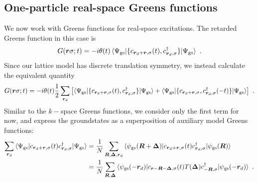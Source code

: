\subsection{One-particle real-space Greens functions}\label{tileRealspaceGreen}
We now work with Greens functions for real-space excitations. The retarded Greens function in this case is
\begin{equation}\begin{aligned}
	G({\bm r}\sigma; t) = -i\theta(t) \braket{\Psi_\text{gs} | \{ c_{{\bm r_d + \bm r},\sigma}(t), c^\dagger_{{\bm r_d},\sigma} \} | \Psi_\text{gs}}~.
\end{aligned}\end{equation}
Since our lattice model has discrete translation symmetry, we instead calculate the equivalent quantity
\begin{equation}\begin{aligned}\label{realFull}
	G({\bm r}\sigma; t) = -i\theta(t) \frac{1}{2}\sum_{\bm r_d}\left[\braket{\Psi_\text{gs} | \{ c_{{\bm r_d + \bm r},\sigma}(t), c^\dagger_{{\bm r_d},\sigma} \} | \Psi_\text{gs}} + \braket{\Psi_\text{gs} | \{ c_{{\bm r_d + \bm r},\sigma}, c^\dagger_{{\bm r_d},\sigma}(-t) \} | \Psi_\text{gs}}\right]~.
\end{aligned}\end{equation}
Similar to the \(k-\)space Greens functions, we consider only the first term for now, and express the groundstates as a superposition of auxiliary model Greens functions:
\begin{equation}\begin{aligned}\label{realCorrInterm}
	\sum_{\bm r_d}\braket{\Psi_\text{gs} | c_{{\bm r_d + \bm r},\sigma}(t) c^\dagger_{{\bm r_d},\sigma} | \Psi_\text{gs}} &= \frac{1}{N}\sum_{\bm R,\bm \Delta,\bm r_d} \braket{\psi_\text{gs}({\bm R + \bm \Delta}) | c_{{\bm r_d + \bm r},\sigma}(t) c^\dagger_{{\bm r_d},\sigma} | \psi_\text{gs}({\bm R})}\\
																											&=\frac{1}{N}\sum_{\bm R,\bm \Delta} \braket{\psi_\text{gs}({-\bm r_d}) |  c_{{\bm r - \bm R - \bm \Delta},\sigma}(t) T({\bm \Delta}) c^\dagger_{{- \bm R},\sigma} | \psi_\text{gs}({-\bm r_d})}~.
\end{aligned}\end{equation}
